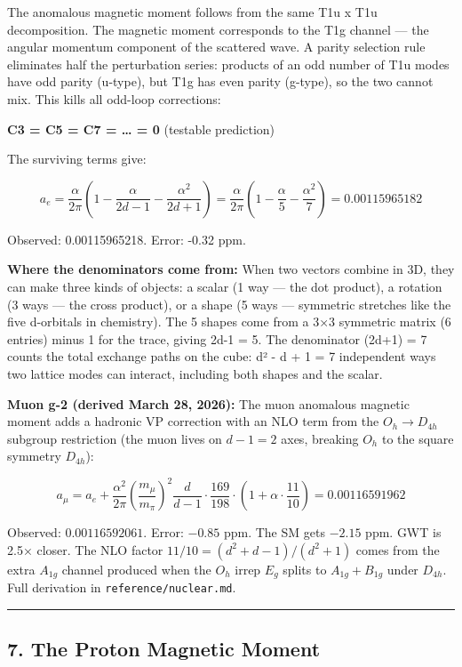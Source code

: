 \documentclass[
]{article}
\begin{document}
The anomalous magnetic moment follows from the same T1u x T1u
decomposition. The magnetic moment corresponds to the T1g channel ---
the angular momentum component of the scattered wave. A parity selection
rule eliminates half the perturbation series: products of an odd number
of T1u modes have odd parity (u-type), but T1g has even parity (g-type),
so the two cannot mix. This kills all odd-loop corrections:

\textbf{C3 = C5 = C7 = \ldots{} = 0} (testable prediction)

The surviving terms give:

\[a_e = \frac{\alpha}{2\pi}\left(1 - \frac{\alpha}{2d-1} - \frac{\alpha^2}{2d+1}\right) = \frac{\alpha}{2\pi}\left(1 - \frac{\alpha}{5} - \frac{\alpha^2}{7}\right) = 0.00115965182\]

Observed: 0.00115965218. Error: -0.32 ppm.

\textbf{Where the denominators come from:} When two vectors combine in
3D, they can make three kinds of objects: a scalar (1 way --- the dot
product), a rotation (3 ways --- the cross product), or a shape (5 ways
--- symmetric stretches like the five d-orbitals in chemistry). The 5
shapes come from a 3×3 symmetric matrix (6 entries) minus 1 for the
trace, giving 2d-1 = 5. The denominator (2d+1) = 7 counts the total
exchange paths on the cube: d² - d + 1 = 7 independent ways two lattice
modes can interact, including both shapes and the scalar.

\textbf{Muon g-2 (derived March 28, 2026):} The muon anomalous magnetic
moment adds a hadronic VP correction with an NLO term from the
\(O_h \to D_{4h}\) subgroup restriction (the muon lives on \(d-1=2\)
axes, breaking \(O_h\) to the square symmetry \(D_{4h}\)):

\[a_\mu = a_e + \frac{\alpha^2}{2\pi}\left(\frac{m_\mu}{m_\pi}\right)^2 \frac{d}{d\!-\!1} \cdot \frac{169}{198} \cdot \left(1 + \alpha\cdot\frac{11}{10}\right) = 0.00116591962\]

Observed: \(0.00116592061\). Error: \(-0.85\) ppm. The SM gets \(-2.15\)
ppm. GWT is 2.5× closer. The NLO factor
\(11/10 = (d^2\!+\!d\!-\!1)/(d^2\!+\!1)\) comes from the extra
\(A_{1g}\) channel produced when the \(O_h\) irrep \(E_g\) splits to
\(A_{1g} + B_{1g}\) under \(D_{4h}\). Full derivation in
\texttt{reference/nuclear.md}.

\begin{center}\rule{0.5\linewidth}{0.5pt}\end{center}

\subsection{7. The Proton Magnetic
Moment}\label{the-proton-magnetic-moment}
\end{document}
